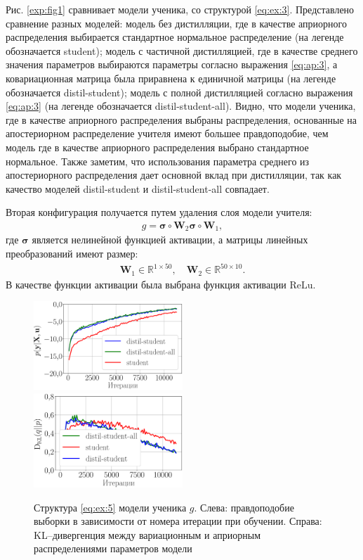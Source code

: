 Рис. \ref{exp:fig1} сравнивает модели ученика, со структурой \eqref{eq:ex:3}. Представлено сравнение разных моделей: модель без дистилляции, где в качестве априорного распределения выбирается стандартное нормальное распределение (на легенде обозначается student); модель с частичной дистилляцией, где в качестве среднего значения параметров выбираются параметры согласно выражения \eqref{eq:ap:3}, а ковариационная матрица была приравнена к единичной матрицы (на легенде обозначается distil-student); модель с полной дистилляцией согласно выражения \eqref{eq:ap:3} (на легенде обозначается distil-student-all). Видно, что модели ученика, где в качестве априорного распределения выбраны распределения, основанные на апостериорном распределение учителя имеют большее правдоподобие, чем модель где в качестве априорного распределения выбрано стандартное нормальное. Также заметим, что использования параметра среднего из апостериорного распределения дает основной вклад при дистилляции, так как качество моделей distil-student и distil-student-all совпадает.

Вторая конфигурация получается путем удаления слоя модели учителя:
\[
\label{eq:ex:5}
\begin{aligned}
g = \bm{\sigma} \circ \mathbf{W}_2\bm{\sigma} \circ \mathbf{W}_1,
\end{aligned}
\]
где $\bm{\sigma}$ является нелинейной функцией активации, а матрицы линейных преобразований имеют размер:
\[
\label{eq:ex:6}
\begin{aligned}
\mathbf{W}_{1} \in \mathbb{R}^{1 \times 50}, \quad \mathbf{W}_{2} \in \mathbb{R}^{50 \times 10}.
\end{aligned}
\]
 В качестве функции активации была выбрана функция активации $\text{ReLu}$.

\begin{figure}[h!]
\includegraphics[width=0.5\textwidth]{results/bayesdistil/synthetic_likelihood_2_layers.eps}
\includegraphics[width=0.5\textwidth]{results/bayesdistil/synthetic_D_KL_2_layers.eps}
\caption{Структура \eqref{eq:ex:5} модели ученика $g$. Слева: правдоподобие выборки в зависимости от номера итерации при обучении. Справа: KL--дивергенция между вариационным и априорным распределениями параметров модели}
\label{exp:fig2}
\end{figure}

